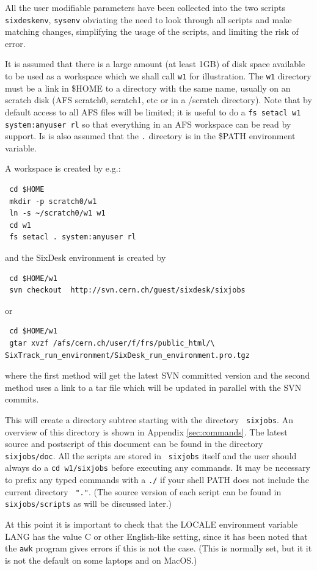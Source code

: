 \documentclass{article}    %
\begin{document}
All the user modifiable parameters have been collected into the two scripts
{\tt sixdeskenv}, {\tt sysenv} obviating the need to look through all scripts
and make matching changes, simplifying the usage of the scripts, and limiting
the risk of error.

It is assumed that there is a large amount (at least 1GB) of disk space
available to be used as a workspace which we shall call {\tt w1} for
illustration. The {\tt w1} directory must be a link in \$HOME to a directory
with the same name, usually on an scratch disk (AFS scratch0, scratch1, etc or
in a /scratch directory).  Note that by default access to all AFS files will
be limited; it is useful to do a {\tt fs setacl w1 system:anyuser rl} so that
everything in an AFS workspace can be read by support. Is is also assumed that the {\tt .} directory is in the {\$PATH} environment variable.

A workspace is created by e.g.:
\begin{verbatim}
 cd $HOME
 mkdir -p scratch0/w1
 ln -s ~/scratch0/w1 w1 
 cd w1
 fs setacl . system:anyuser rl
\end{verbatim}
and the SixDesk environment is created by 
\begin{verbatim}
 cd $HOME/w1
 svn checkout  http://svn.cern.ch/guest/sixdesk/sixjobs
\end{verbatim}
or
\begin{verbatim}
 cd $HOME/w1
 gtar xvzf /afs/cern.ch/user/f/frs/public_html/\
SixTrack_run_environment/SixDesk_run_environment.pro.tgz
\end{verbatim}
where the first method will get the latest SVN committed version
and the second method uses a link to a tar file which will be updated 
in parallel with the SVN commits.  

This will create a directory subtree starting with the directory {\tt
sixjobs}. An overview of this directory is shown in Appendix
\ref{sec:commands}.  The latest source and postscript of this document can be
found in the directory {\tt sixjobs/doc}.  All the scripts are stored in {\tt
sixjobs} itself and the user should always do a {\tt cd w1/sixjobs} before
executing any commands. It may be necessary to prefix any typed commands with
a {\tt ./} if your shell PATH does not include the current directory {\tt
"."}.  (The source version of each script can be found in {\tt
sixjobs/scripts} as will be discussed later.)

At this point it is important to check that the LOCALE environment variable
LANG has the value C or other English-like setting, since it has been noted
that the {\tt awk} program gives errors if this is not the case. (This is
normally set, but it it is not the default on some laptops and on MacOS.)
\end{document}
